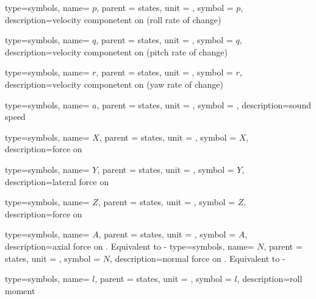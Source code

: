 {type=symbols,
	name= \ensuremath{p},
	parent = {states},
	unit = \unexpanded{\si{\radian\per\second}},
	symbol = \ensuremath{p},
	description={velocity componetent on  (roll rate of change)}
}

{type=symbols,
	name= \ensuremath{q},
	parent = {states},
	unit = \unexpanded{\si{\radian\per\second}},
	symbol = \ensuremath{q},
	description={velocity componetent on  (pitch rate of change)}
}

{type=symbols,
	name= \ensuremath{r},
	parent = {states},
	unit = \unexpanded{\si{\radian\per\second}},
	symbol = \ensuremath{r},
	description={velocity componetent on  (yaw rate of change)}
}

{type=symbols,
	name= \ensuremath{a},
	parent = {states},
	unit = \unexpanded{\si{\meter\per\second}},
	symbol = ,
	description={sound speed}
}

{type=symbols,
	name= \ensuremath{X},
	parent = {states},
	unit = \unexpanded{\si{\newton}},
	symbol = \ensuremath{X},
	description={force on }
}

{type=symbols,
	name= \ensuremath{Y},
	parent = {states},
	unit = \unexpanded{\si{\newton}},
	symbol = \ensuremath{Y},
	description={lateral force on }
}



{type=symbols,
	name= \ensuremath{Z},
	parent = {states},
	unit = \unexpanded{\si{\newton}},
	symbol = \ensuremath{Z},
	description={force on }
}

{type=symbols,
	name= \ensuremath{A},
	parent = {states},
	unit = \unexpanded{\si{\newton}},
	symbol = \ensuremath{A},
	description={axial force on . Equivalent to -}
}
{type=symbols,
	name= \ensuremath{N},
	parent = {states},
	unit = \unexpanded{\si{\newton}},
	symbol = \ensuremath{N},
	description={normal force on . Equivalent to -}
}



{type=symbols,
	name= \ensuremath{l},
	parent = {states},
	unit = \unexpanded{\si{\newton\meter}},
	symbol = \ensuremath{l},
	description={roll moment}
}

